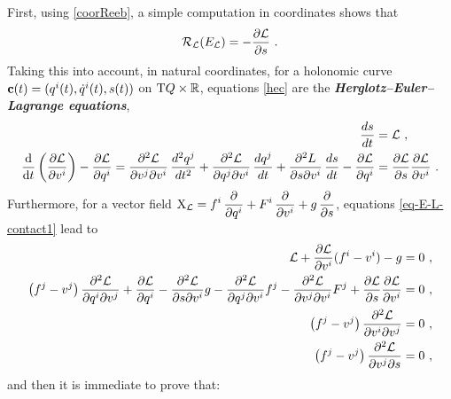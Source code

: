 \documentclass[12pt]{report}
\def\derpar#1#2{\frac{\partial{#1}}{\partial{#2}}}
\def\Lag{{\cal L}}
\def\d{{\rm d}}
\def\Real{\mathbb{R}}
\def\X{{\rm X}}
\def\Tan{{\rm T}}
\newcommand{\Reeb}{\mathcal{R}}
\begin{document}
First, using \eqref{coorReeb}, a simple computation in coordinates shows that
\begin{equation}
\label{ReebLag}
\Reeb_\Lag(E_\Lag)=-\derpar{\Lag}{s} \ .
\end{equation}
Taking this into account, in natural coordinates, for a holonomic curve
${\bf c}(t)=(q^i(t),\dot q^i(t),s(t))$ on $\Tan Q\times\Real$,
equations \eqref{hec} are the {\sl\textbf{ Herglotz--Euler--Lagrange equations}},
\begin{align}\label{ELeqs2}
\frac{ds}{dt}&=\Lag \ ,
 \\
\label{ELeqs3}
\frac{\d}{\d t}\left(\derpar{\Lag}{v^i}\right)-
\displaystyle\frac{\partial\Lag}{\partial q^i}=
\displaystyle\frac{\partial^2\Lag}{\partial v^j \partial v^i}\,
\frac{d^2q^j}{dt^2} +\displaystyle\frac{\partial^2\Lag}{\partial q^j\partial v^i}\,\frac{dq^j}{dt}+
\displaystyle \frac{\partial^2L}{\partial s \partial v^i}\, \frac{ds}{dt}
-\displaystyle\frac{\partial\Lag}{ \partial q^i}&=
\displaystyle\frac{\partial\Lag}{\partial s}\displaystyle\frac{\partial\Lag}{\partial v^i} \ .
\end{align}
Furthermore, for a vector field
$\X_\Lag=\displaystyle f^i\,\frac{\partial}{\partial q^i}+F^i\,\frac{\partial}{\partial v^i}+
g\,\frac{\partial}{\partial s}$,
equations \eqref{eq-E-L-contact1} lead to
\begin{align}
\displaystyle
\Lag+\frac{\partial\Lag}{\partial v^i} (f^i-v^i) -g 
&= 0\ ,
\label{A-E-L-eqs4}
\\
\left( f^j-v^j \right)
\frac{\partial^2\Lag}{\partial q^i \partial v^j}
+\frac{\partial\Lag}{\partial q^i}
-\frac{\partial^2\Lag}{\partial s \partial v^i}g
-\frac{\partial^2\Lag}{\partial q^j \partial v^i}f^j
-\frac{\partial^2\Lag}{\partial v^j \partial v^i}F^j
+\frac{\partial\Lag}{\partial s}
\frac{\partial\Lag}{\partial v^i}
&= 0\ ,
\label{A-E-L-eqs3}
\\
\left( f^j-v^j \right)
\frac{\partial^2\Lag}{\partial v^i \partial v^j}
&=0
\label{A-E-L-eqs1} \ ,
\\
\left( f^j-v^j \right)
\frac{\partial^2\Lag}{\partial v^j \partial s}
&=0 \ ,
\label{A-E-L-eqs2}
\end{align}
and then it is immediate to prove that:
\end{document}
